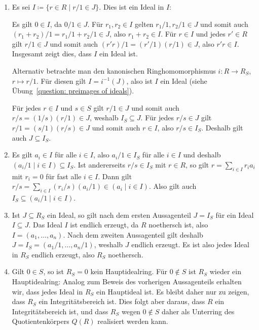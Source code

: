 \begin{solution}
  \begin{enumerate}
    \item
      Es sei $I \coloneqq \{r \in R \mid r/1 \in J\}$.
      Dies ist ein Ideal in $I$:
      
      Es gilt $0 \in I$, da $0/1 \in J$.
      Für $r_1, r_2 \in I$ gelten $r_1/1, r_2/1 \in J$ und somit auch $(r_1 + r_2)/1 = r_1/1 + r_2/1 \in J$, also $r_1 + r_2 \in I$.
      Für $r \in I$ und jedes $r' \in R$ gilt $r/1 \in J$ und somit auch $(r' r)/1 = (r'/1)(r/1) \in J$, also $r' r \in I$.
      Insgesamt zeigt dies, dass $I$ ein Ideal ist.
      
      Alternativ betrachte man den kanonischen Ringhomomorphismus $i \colon R \to R_S$, $r \mapsto r/1$.
      Für diesen gilt $I = i^{-1}(J)$, also ist $I$ ein Ideal (siehe Übung~\ref{question: preimages of ideals}).
      
      Für jedes $r \in I$ und $s \in S$ gilt $r/1 \in J$ und somit auch $r/s = (1/s)(r/1) \in J$, weshalb $I_S \subseteq J$.
      Für jedes $r/s \in J$ gilt $r/1 = (s/1)(r/s) \in J$ und somit auch $r \in I$, also $r/s \in I_S$.
      Deshalb gilt auch $J \subseteq I_S$.
      
    \item
      Es gilt $a_i \in I$ für alle $i \in I$, also $a_i/1 \in I_S$ für alle $i \in I$ und deshalb $(a_i/1 \mid i \in I) \subseteq I_S$.
      Ist andererseits $r/s \in I_S$ mit $r \in R$, so gilt $r = \sum_{i \in I} r_i a_i$ mit $r_i = 0$ für fast alle $i \in I$.
      Dann gilt $r/s = \sum_{i \in I} (r_i/s)(a_i/1) \in (a_i \mid i \in I)$.
      Also gilt auch $I_S \subseteq (a_i/1 \mid i \in I)$.
    
    \item
      Ist $J \subseteq R_S$ ein Ideal, so gilt nach dem ersten Aussagenteil $J = I_S$ für ein Ideal $I \subseteq J$.
      Das Ideal $I$ ist endlich erzeugt, da $R$ noethersch ist, also $I = (a_1, \dotsc, a_n)$.
      Nach dem zweiten Aussagenteil gilt deshalb $J = I_S = (a_1/1, \dotsc, a_n/1)$, weshalb $J$ endlich erzeugt.
      Es ist also jedes Ideal in $R_S$ endlich erzeugt, also $R_S$ noethersch.
    
    \item
      Gilt $0 \in S$, so ist $R_S = 0$ kein Hauptidealring.
      Für $0 \notin S$ ist $R_S$ wieder ein Hauptidealring:
      Analog zum Beweis des vorherigen Aussagenteils erhalten wir, dass jedes Ideal in $R_S$ ein Hauptideal ist.
      Es bleibt daher nur zu zeigen, dass $R_S$ ein Integritätsbereich ist.
      Dies folgt aber daraus, dass $R$ ein Integritätsbereich ist, und dass $R_S$ wegen $0 \notin S$ daher als Unterring des Quotientenkörpers $Q(R)$ realisiert werden kann.
  \end{enumerate}
\end{solution}


